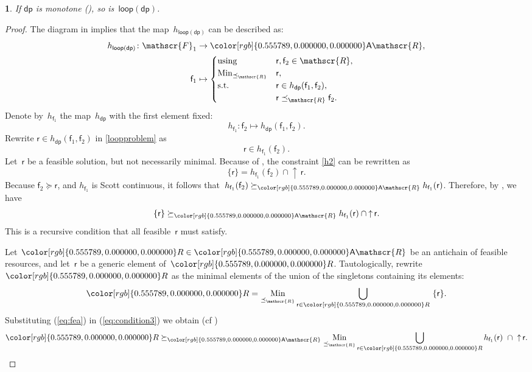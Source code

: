 \documentclass[twocolumn,english]{IEEEtran}
\theoremstyle{definition}
\theoremstyle{plain}
\theoremstyle{definition}
\theoremstyle{remark}
\theoremstyle{definition}
\theoremstyle{plain}
\newtheorem{prop}{\protect\propositionname}
\theoremstyle{plain}
\newcommand{\aword}[1]{\mathsf{#1}}
\newcommand{\vmath}[1]{\aword{#1}}
\newcommand{\subto}{\text{s.t.}}
\newcommand{\with}{\text{using}}
\DeclareMathOperator*{\Min}{Min}
\newcommand{\posleq}{\preceq}
\newcommand{\posgeq}{\succeq}
\newcommand{\antichains}{\vmath{A}}
\newcommand{\upit}{{\uparrow\,}}
\newcommand{\ftor}{{h}}
\newcommand{\funsp}{\mathscr{F}}
\newcommand{\fun}{\vmath{f}}
\newcommand{\res}{\vmath{r}}
\newcommand{\resleq}{\posleq_{\ressp}}
\newcommand{\ressp}{\mathscr{R}}
\newcommand{\dprob}{\vmath{dp}}
\newcommand{\dploop}{\vmath{loop}}
\newcommand{\Aressp}{{\antichains\ressp}}
\newcommand{\colR}{\color[rgb]{0.555789,0.000000,0.000000}}
\newcommand{\R}[1]{{\colR #1}}
\renewcommand{\resleq}{\posleq_{\ressp}}
\renewcommand{\Aressp}{{\colR\antichains\ressp}}
\newcommand{\scottcontinuous}{Scott continuous\xspace}
\providecommand{\propositionname}{Proposition}
\begin{document}
\begin{prop}
\label{pro:loop-continuous}If $\dprob$ is monotone (),
so is~$\dploop(\dprob)$.
\end{prop}
\begin{proof}
The diagram in  implies that the map~$\ftor_{\dploop(\dprob)}$
can be described as:
\begin{align}
\ftor_{\dploop(\dprob)}\colon\funsp_{1} & \rightarrow\Aressp,\label{eq:loopproblem}\\
\fun_{1} & \mapsto\begin{cases}
\with & \res,\fun_{2}\in\ressp,\\
\Min_{\resleq} & \res,\\
\subto & \res\in\ftor_{\dprob}(\fun_{1},\fun_{2}),\\
 & \res\resleq\fun_{2}.
\end{cases}
\end{align}
Denote by~$\ftor_{\fun_{1}}$ the map~$\ftor_{\dprob}$ with the
first element fixed:
\[
\ftor_{\fun_{1}}\colon\fun_{2}\mapsto\ftor_{\dprob}(\fun_{1},\fun_{2}).
\]
Rewrite $\res\in\ftor_{\dprob}(\fun_{1},\fun_{2})$ in \eqref{loopproblem}
as
\begin{equation}
\res\in\ftor_{\fun_{1}}(\fun_{2}).\label{eq:h2}
\end{equation}
Let~$\res$ be a feasible solution, but not necessarily minimal.
Because of , the constraint \eqref{h2} can
be rewritten as 
\begin{equation}
\{\res\}=\ftor_{\fun_{1}}(\fun_{2})\cap\upit\res.\label{eq:h3}
\end{equation}
Because $\fun_{2}\posgeq\res$, and $\ftor_{\fun_{1}}$ is \scottcontinuous,
it follows that~$\ftor_{\fun_{1}}(\fun_{2})\posgeq_{\Aressp}\ftor_{\fun_{1}}(\res)$.
Therefore, by , we have
\begin{equation}
\{\res\}\posgeq_{\Aressp}\ftor_{\fun_{1}}(\res)\cap\upit\res.\label{eq:fea}
\end{equation}
This is a recursive condition that all feasible~$\res$ must satisfy.

Let $\R{R}\in\Aressp$ be an antichain of feasible resources, and
let~$\res$ be a generic element of~$\R{R}$. Tautologically, rewrite~$\R{R}$
as the minimal elements of the union of the singletons containing
its elements: 
\begin{equation}
\R{R}=\Min_{\resleq}\bigcup_{\res\in\R{R}}\ \{\res\}.\label{eq:condition3}
\end{equation}
Substituting (\ref{eq:fea}) in (\ref{eq:condition3}) we obtain (cf
)
\begin{equation}
\R{R}\posgeq_{\Aressp}\Min_{\resleq}\bigcup_{\res\in\R{R}}\ftor_{\fun_{1}}(\res)\ \cap\ \upit\res.\label{eq:recursive}
\end{equation}


\end{proof}
\end{document}
